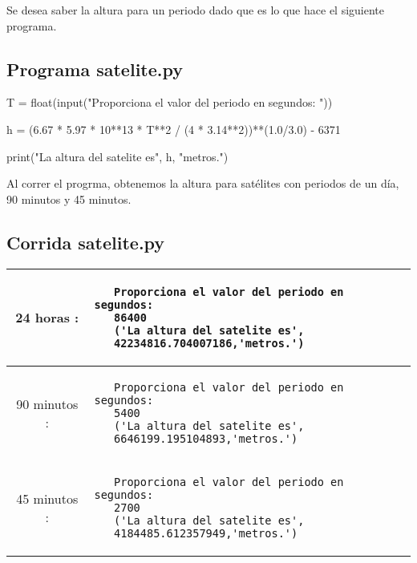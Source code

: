\documentclass[12pt,spanish]{article}
\begin{document}
Se desea saber la altura para un periodo dado que es lo que hace el siguiente programa.

\subsection*{Programa satelite.py}

\begin{center}
 \begin{boxedverbatim}

  T = float(input("Proporciona el valor del periodo en
  segundos: "))

  h = (6.67 * 5.97 * 10**13 * T**2 / (4 * 3.14**2))**(1.0/3.0)
  - 6371

  print("La altura del satelite es", h, "metros.")

 \end{boxedverbatim}
\end{center}


Al correr el progrma, obtenemos la altura para satélites con periodos de un día, 90 minutos y 45 minutos.


\subsection*{Corrida satelite.py}

\begin{center}
\begin{tabular}{| c | m{10.5cm} |}
  \hline
  24 horas : &
  \begin{verbatim}
   Proporciona el valor del periodo en segundos:
   86400
   ('La altura del satelite es',
   42234816.704007186,'metros.')
  \end{verbatim}
  \\ \hline
  90 minutos : &
  \begin{verbatim}
   Proporciona el valor del periodo en segundos:
   5400
   ('La altura del satelite es',
   6646199.195104893,'metros.')
  \end{verbatim}
   \\ \hline
  45 minutos : &
  \begin{verbatim}
   Proporciona el valor del periodo en segundos:
   2700
   ('La altura del satelite es',
   4184485.612357949,'metros.')
  \end{verbatim}
  \\ \hline

\end{tabular}
\end{center}
\end{document}
